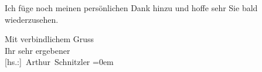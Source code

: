 \pstart
           Ich füge noch meinen persönlichen Dank hinzu und hoffe sehr Sie bald
               wiederzusehen.\pend
           
\pstart
           Mit verbindlichem Gruss{\\[\baselineskip]}Ihr sehr ergebener{\\[\baselineskip]}\spacefill\mbox{{[}hs.:{]} Arthur Schnitzler}\pend
           \leftskip=0em{}\endnumbering{}  
      